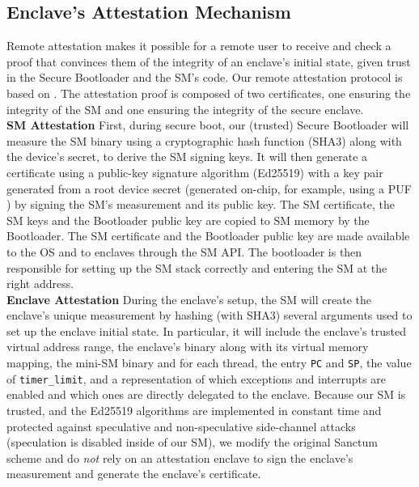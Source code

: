 \subsection{Enclave's Attestation Mechanism}
\label{app:attestation}
Remote attestation makes it possible for a remote user to receive and check a proof that convinces them of the integrity of an enclave's initial state, given trust in the Secure Bootloader and the SM's code.
Our remote attestation protocol is based on \cite{lebedev2018secure}.
The attestation proof is composed of two certificates, one ensuring the integrity of the SM and one ensuring the integrity of the secure enclave.
\\

\noindent\textbf{SM Attestation}
First, during secure boot, our (trusted) Secure Bootloader will measure the SM binary using a cryptographic hash function (SHA3) along with the device's secret, to derive the SM signing keys.
It will then generate a certificate using a public-key signature algorithm (Ed25519) with a key pair generated from a root device secret (generated on-chip, for example, using a PUF \cite{herder2014physical}) by signing the SM's measurement and its public key.
The SM certificate, the SM keys and the Bootloader public key are copied to SM memory by the Bootloader.
The SM certificate and the Bootloader public key are made available to the OS and to enclaves through the SM API.
The bootloader is then responsible for setting up the SM stack correctly and entering the SM at the right address.
\\

\noindent\textbf{Enclave Attestation}
During the enclave's setup, the SM will create the enclave's unique measurement by hashing (with SHA3) several arguments used to set up the enclave initial state.
In particular, it will include the enclave's trusted virtual address range, the enclave's binary along with its virtual memory mapping, the mini-SM binary and for each thread, the entry \texttt{PC} and \texttt{SP}, the value of \texttt{timer\_limit}, and a representation of which exceptions and interrupts are enabled and which ones are directly delegated to the enclave.
Because our SM is trusted, and the Ed25519 algorithms are implemented in constant time and protected against speculative and non-speculative side-channel attacks (speculation is disabled inside of our SM), we modify the original Sanctum scheme \cite{costan2016sanctum} and do {\em not} rely on an attestation enclave to sign the enclave's measurement and generate the enclave's certificate.

